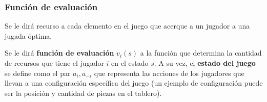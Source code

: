 \subsubsection{Función de evaluación}
  \begin{definition}
    Se le dirá recurso a cada elemento en el juego que acerque a un jugador a una jugada óptima.
  \end{definition}

  Se le dirá \textbf{función de evaluación}\cite{noauthor_evaluation_2022} \(v_i(s)\) a la función 
  que determina la cantidad de recursos que tiene el jugador \(i\) en el estado \(s\).
  A su vez, el \textbf{estado del juego} se define como el par \(a_i, a_{-i}\) que representa las
  acciones de los jugadores que llevan a una configuración específica del juego (un ejemplo de
  configuración puede ser la posición y cantidad de piezas en el tablero).